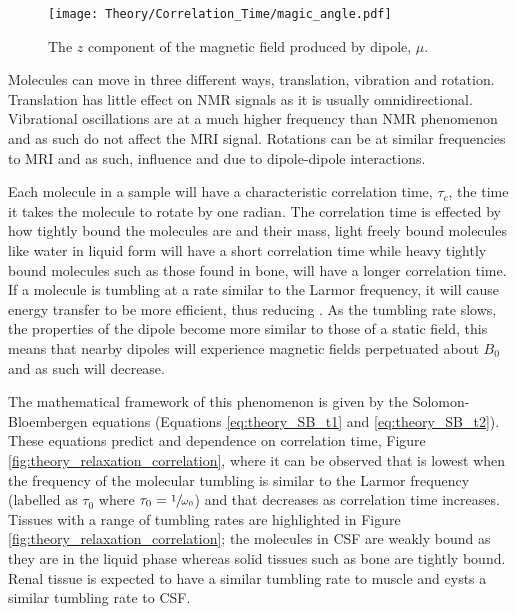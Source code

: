 \begin{figure}[H]
	\centering
	\texttt{[image: Theory/Correlation\_Time/magic\_angle.pdf]}
	\caption{The $z$ component of the magnetic field produced by dipole, $\mu$.}
	\label{fig:theory_magic_angle}	
\end{figure}

Molecules can move in three different ways, translation, vibration and rotation. Translation has little effect on \ac{NMR} signals as it is usually omnidirectional. Vibrational oscillations are at a much higher frequency than \ac{NMR} phenomenon and as such do not affect the \ac{MRI} signal. Rotations can be at similar frequencies to \ac{MRI} and as such, influence \tone and \ttwo due to dipole-dipole interactions.

Each molecule in a sample will have a characteristic correlation time, $\tau_c$, the time it takes the molecule to rotate by one radian. The correlation time is effected by how tightly bound the molecules are and their mass, light freely bound molecules like water in liquid form will have a short correlation time while heavy tightly bound molecules such as those found in bone, will have a longer correlation time. If a molecule is tumbling at a rate similar to the Larmor frequency, it will cause energy transfer to be more efficient, thus reducing \tone. As the tumbling rate slows, the properties of the dipole become more similar to those of a static field, this means that nearby dipoles will experience magnetic fields perpetuated about $B_0$ and as such \ttwo will decrease.

The mathematical framework of this phenomenon is given by the Solomon-Bloembergen equations \cite{solomon_relaxation_1955} (Equations \eqref{eq:theory_SB_t1} and \eqref{eq:theory_SB_t2}). These equations predict \tone and \ttwo dependence on correlation time, Figure \ref{fig:theory_relaxation_correlation}, where it can be observed that \tone is lowest when the frequency of the molecular tumbling is similar to the Larmor frequency (labelled as $\tau_0$ where $\tau_0=\sfrac{1}{\omega_0}$) and that \ttwo decreases as correlation time increases. Tissues with a range of tumbling rates are highlighted in Figure \ref{fig:theory_relaxation_correlation}; the molecules in \ac{CSF} are weakly bound as they are in the liquid phase whereas solid tissues such as bone are tightly bound. Renal tissue is expected to have a similar tumbling rate to muscle and cysts a similar tumbling rate to \ac{CSF}.

